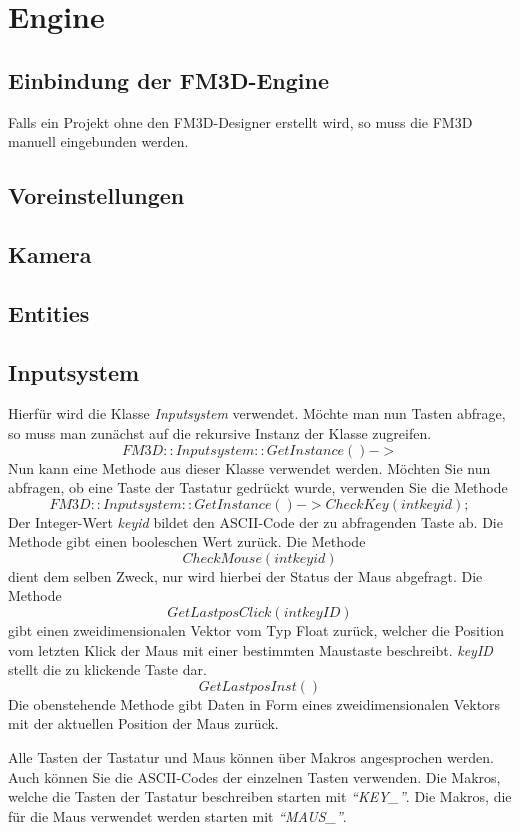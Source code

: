 \section{Engine}
\label{verwendung_engine}

\subsection{Einbindung der FM3D-Engine}
Falls ein Projekt ohne den FM3D-Designer erstellt wird, so muss die FM3D manuell eingebunden werden. 

\subsection{Voreinstellungen}

\subsection{Kamera}

\subsection{Entities}

\subsection{Inputsystem}
\label{inputsystemver}
Hierfür wird die Klasse \textit{Inputsystem} verwendet. Möchte man nun Tasten abfrage, so muss man zunächst auf die rekursive Instanz der Klasse zugreifen. 
$$FM3D::Inputsystem::GetInstance()->$$
Nun kann eine Methode aus dieser Klasse verwendet werden.
Möchten Sie nun abfragen, ob eine Taste der Tastatur gedrückt wurde, verwenden Sie die Methode
$$FM3D::Inputsystem::GetInstance()->CheckKey(int  keyid);$$
Der Integer-Wert \textit{keyid} bildet den ASCII-Code der zu abfragenden Taste ab. Die Methode gibt einen booleschen Wert zurück. Die Methode $$CheckMouse(int  keyid)$$ dient dem selben Zweck, nur wird hierbei der Status der Maus abgefragt.
Die Methode $$GetLastposClick(int keyID)$$
gibt einen zweidimensionalen Vektor vom Typ Float zurück, welcher die Position vom letzten Klick der Maus mit einer bestimmten Maustaste beschreibt. \textit{keyID} stellt die zu klickende Taste dar. 
$$GetLastposInst()$$
Die obenstehende Methode gibt Daten in Form eines zweidimensionalen Vektors mit der aktuellen Position der Maus zurück.

Alle Tasten der Tastatur und Maus können über Makros angesprochen werden. Auch können Sie die ASCII-Codes der einzelnen Tasten verwenden. Die Makros, welche die Tasten der Tastatur beschreiben starten mit \textit{"`KEY\_"'}. Die Makros, die für die Maus verwendet werden starten mit \textit{"`MAUS\_"'}.
